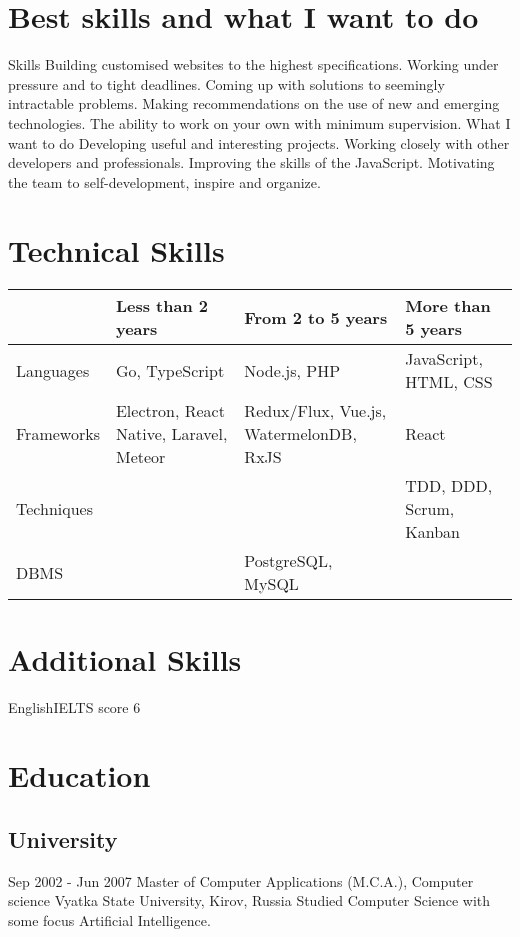 \documentclass[11pt,a4paper]{moderncv}
\begin{document}
\maketitle
\section{Best skills and what I want to do}
  \cvline
    {Skills}{
      Building customised websites to the highest specifications.
      Working under pressure and to tight deadlines.
      Coming up with solutions to seemingly intractable problems.
      Making recommendations on the use of new and emerging technologies.
      The ability to work on your own with minimum supervision.}
  \cvline
    {What I want to do}{
      Developing useful and interesting projects.
      Working closely with other developers and professionals.
      Improving the skills of the JavaScript.
      Motivating the team to self-development, inspire and organize.}

\section{Technical Skills}

\begin{tabular}{ l||m{4cm}|m{4cm}|m{4cm}|  }
  & Less than 2 years & From 2 to 5 years & More than 5 years \\
  \hline\hline
  Languages & Go, TypeScript & Node.js, PHP & JavaScript, HTML, CSS \\
  \hline
  Frameworks & Electron, React Native, Laravel, Meteor & Redux/Flux, Vue.js, WatermelonDB, RxJS & React \\
  \hline
  Techniques & & & TDD, DDD, Scrum, Kanban \\
  \hline
  DBMS & & PostgreSQL, MySQL & \\
  \hline
\end{tabular}

\section{Additional Skills}
  \cvline
    {English}{IELTS score 6}

\section{Education}
  \subsection{University}
  \cventry
    {Sep 2002 - Jun 2007}
    {Master of Computer Applications (M.C.A.), Computer science}
    {\newline Vyatka State University, Kirov, Russia}
    {}{}
    {Studied Computer Science with some focus Artificial Intelligence.}
\end{document}
